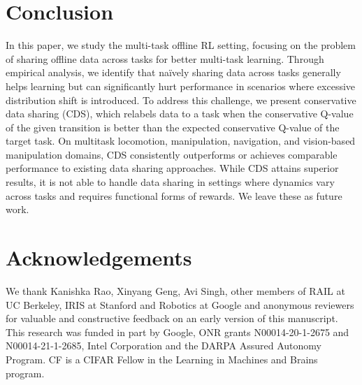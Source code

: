 \documentclass{article}
\begin{document}










\vspace{-5pt}
\section{Conclusion}
\vspace{-5pt}
\label{sec:conclusion}
In this paper, we study the multi-task offline RL setting, focusing on the problem of sharing offline data across tasks for better multi-task learning. Through empirical analysis, we identify that na\"{i}vely sharing data across tasks generally helps learning but can significantly hurt performance in scenarios where excessive distribution shift is introduced. To address this challenge, we present conservative data sharing (CDS), which relabels data to a task when the conservative Q-value of the given transition is better than the expected conservative Q-value of the target task. On multitask locomotion, manipulation, navigation, and vision-based manipulation domains, CDS consistently outperforms or achieves comparable performance to existing data sharing approaches. While CDS attains superior results, it is not able to handle data sharing in settings where dynamics vary across tasks and requires functional forms of rewards. We leave these as future work. 

\section*{Acknowledgements}
We thank Kanishka Rao, Xinyang Geng, Avi Singh, other members of RAIL at UC Berkeley, IRIS at Stanford and Robotics at Google and anonymous reviewers for valuable and constructive feedback on an early version of this manuscript. This research was funded in part by Google, ONR grants N00014-20-1-2675 and N00014-21-1-2685, Intel Corporation and the DARPA Assured Autonomy Program. CF is a CIFAR Fellow in the Learning in Machines and Brains program. 
\end{document}
